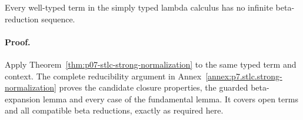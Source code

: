 \begin{theorem}
Every well-typed term in the simply typed lambda calculus has no infinite
beta-reduction sequence.
\end{theorem}

\paragraph{Proof.}
Apply Theorem~\ref{thm:p07-stlc-strong-normalization} to the same typed term
and context. The complete reducibility argument in
Annex~\ref{annex:p7.stlc.strong-normalization} proves the candidate closure
properties, the guarded beta-expansion lemma and every case of the
fundamental lemma. It covers open terms and all compatible beta reductions,
exactly as required here.
